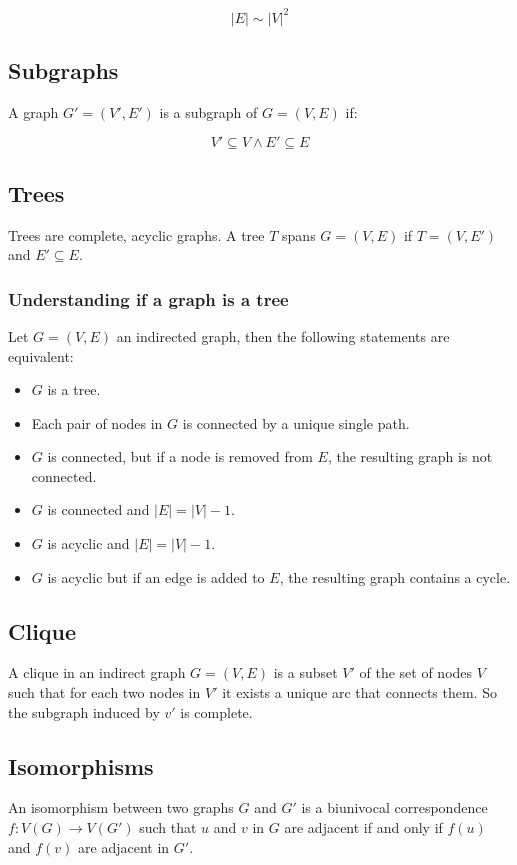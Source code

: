		$$|E|\sim|V|^2$$

	\subsection{Subgraphs}
	A graph $G' = (V', E')$ is a subgraph of $G = (V,E)$ if:

	$$V'\subseteq V \land E'\subseteq E$$

	\subsection{Trees}
	Trees are complete, acyclic graphs.
	A tree $ T$ spans $G = (V,E)$ if $T = (V,E')$ and $E'\subseteq E$.

		\subsubsection{Understanding if a graph is a tree}
		Let $G = (V,E)$ an indirected graph, then the following statements are equivalent:

		\begin{multicols}{2}
			\begin{itemize}
				\item $G$ is a tree.
				\item Each pair of nodes in $G$ is connected by a unique single path.
				\item $G$ is connected, but if a node is removed from $E$, the resulting graph is not connected.
				\item $G$ is connected and $|E| = |V|-1$.
				\item $G$ is acyclic and $|E| = |V|-1$.
				\item $G$ is acyclic but if an edge is added to $E$, the resulting graph contains a cycle.
			\end{itemize}
		\end{multicols}

	\subsection{Clique}
	A clique in an indirect graph $G = (V,E)$ is a subset $V'$ of the set of nodes $V$ such that for each two nodes in $V'$ it exists a unique arc that connects them.
	So the subgraph induced by $v'$ is complete.

	\subsection{Isomorphisms}
	An isomorphism between two graphs $G$ and $G'$ is a biunivocal correspondence $f:V(G)\rightarrow V(G')$ such that $u$ and $v$ in $G$ are adjacent if and only if $f(u)$ and $f(v)$ are adjacent in $G'$.

